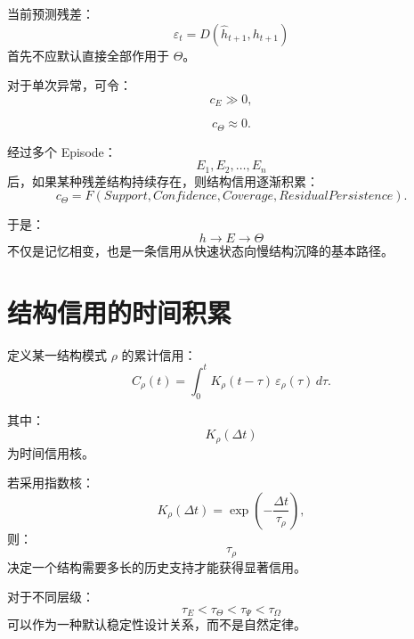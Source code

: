 当前预测残差：
\begin{equation}
\varepsilon_t
=
D(
\hat h_{t+1},
h_{t+1}
)
\end{equation}
首先不应默认直接全部作用于 $\Theta$。

对于单次异常，可令：
\begin{equation}
c_E\gg0,
\end{equation}

\begin{equation}
c_\Theta\approx0.
\end{equation}

经过多个 Episode：
\begin{equation}
E_1,E_2,\ldots,E_n
\end{equation}
后，如果某种残差结构持续存在，则结构信用逐渐积累：
\begin{equation}
c_\Theta
=
F(
Support,
Confidence,
Coverage,
ResidualPersistence
).
\end{equation}

于是：
\begin{equation}
\boxed{
h
\rightarrow
E
\rightarrow
\Theta
}
\end{equation}
不仅是记忆相变，也是一条信用从快速状态向慢结构沉降的基本路径。


\section{结构信用的时间积累}

定义某一结构模式 $\rho$ 的累计信用：
\begin{equation}
C_\rho(t)
=
\int_{0}^{t}
K_\rho(t-\tau)
\,
\varepsilon_\rho(\tau)
\,d\tau .
\end{equation}

其中：
\begin{equation}
K_\rho(\Delta t)
\end{equation}
为时间信用核。

若采用指数核：
\begin{equation}
K_\rho(\Delta t)
=
\exp
\left(
-\frac{\Delta t}{\tau_\rho}
\right),
\end{equation}
则：
\begin{equation}
\tau_\rho
\end{equation}
决定一个结构需要多长的历史支持才能获得显著信用。

对于不同层级：
\begin{equation}
\tau_E
<
\tau_\Theta
<
\tau_\Psi
<
\tau_\Omega
\end{equation}
可以作为一种默认稳定性设计关系，而不是自然定律。


